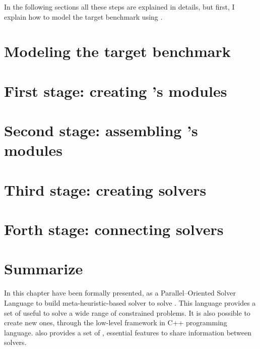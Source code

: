 
In the following sections all these steps are explained in details, but first, I explain how to model the target benchmark using \posl.

\section{Modeling the target benchmark}
\label{sec:model}



\section{First stage: creating \posl's modules}
\label{sec:1ststage}



\section{Second stage: assembling \posl's modules}
\label{sec:2ndstage}



\section{Third stage: creating \posl{} solvers}
\label{sec:3rdstage}



\section{Forth stage: connecting solvers}
\label{sec:4thstage}



\section{Summarize}
\label{sec:posl_zum}

In this chapter \posl{} have been formally presented, as a Parallel--Oriented Solver Language to build meta-heuristic-based solver to solve \CSPs{}. This language provides a set of \oms{} useful to solve a wide range of constrained problems. It is also possible to create new ones, through the low-level framework in C++ programming language. \posl{} also provides a set of \opchs{}, essential features to share information between solvers.

